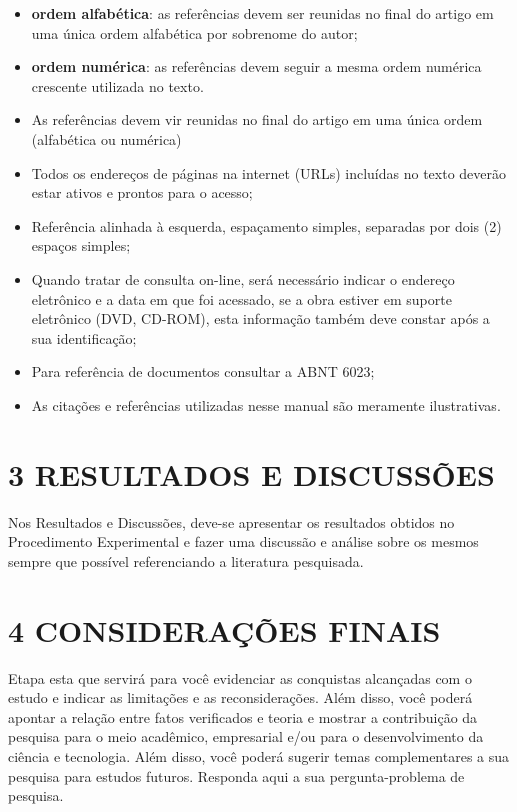 \documentclass[
]{article}
\begin{document}
\begin{itemize}
\item
  \textbf{ordem alfabética}: as referências devem ser reunidas no final
  do artigo em uma única ordem alfabética por sobrenome do autor;
\item
  \textbf{ordem numérica}: as referências devem seguir a mesma ordem
  numérica crescente utilizada no texto.
\item
  As referências devem vir reunidas no final do artigo em uma única
  ordem (alfabética ou numérica)
\item
  Todos os endereços de páginas na internet (URLs) incluídas no texto
  deverão estar ativos e prontos para o acesso;
\item
  Referência alinhada à esquerda, espaçamento simples, separadas por
  dois (2) espaços simples;
\item
  Quando tratar de consulta on-line, será necessário indicar o endereço
  eletrônico e a data em que foi acessado, se a obra estiver em suporte
  eletrônico (DVD, CD-ROM), esta informação também deve constar após a
  sua identificação;
\item
  Para referência de documentos consultar a ABNT 6023;
\item
  As citações e referências utilizadas nesse manual são meramente
  ilustrativas.
\end{itemize}

\section{3 RESULTADOS E DISCUSSÕES}\label{resultados-e-discussuxf5es}

Nos Resultados e Discussões, deve-se apresentar os resultados obtidos no
Procedimento Experimental e fazer uma discussão e análise sobre os
mesmos sempre que possível referenciando a literatura pesquisada.

\section{4 CONSIDERAÇÕES FINAIS}\label{considerauxe7uxf5es-finais}

Etapa esta que servirá para você evidenciar as conquistas alcançadas com
o estudo e indicar as limitações e as reconsiderações. Além disso, você
poderá apontar a relação entre fatos verificados e teoria e mostrar a
contribuição da pesquisa para o meio acadêmico, empresarial e/ou para o
desenvolvimento da ciência e tecnologia. Além disso, você poderá sugerir
temas complementares a sua pesquisa para estudos futuros. Responda aqui
a sua pergunta-problema de pesquisa.
\end{document}
